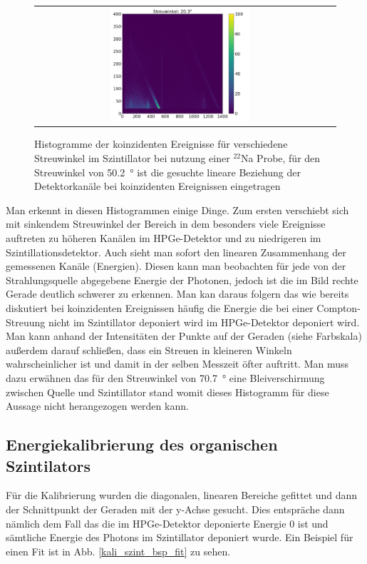 \begin{figure}[ht]
\begin{tabular}{c c}
        \includegraphics[width=0.49\textwidth]{images/kali_szint_Streuwinkel_20.png} & \\
    \end{tabular}
	\caption{Histogramme der koinzidenten Ereignisse für verschiedene Streuwinkel im Szintillator bei nutzung einer $^{22}$Na Probe, für den Streuwinkel von \SI{50.2}{\degree} ist die gesuchte lineare Beziehung der Detektorkanäle bei koinzidenten Ereignissen eingetragen}
	\label{kali_szint_winkelabh}
\end{figure}

Man erkennt in diesen Histogrammen einige Dinge. Zum ersten verschiebt sich mit sinkendem Streuwinkel der Bereich in dem besonders viele Ereignisse auftreten zu höheren Kanälen im HPGe-Detektor und zu niedrigeren im Szintillationsdetektor. Auch sieht man sofort den linearen Zusammenhang der gemessenen Kanäle (Energien). Diesen kann man beobachten für jede von der Strahlungsquelle abgegebene Energie der Photonen, jedoch ist die im Bild rechte Gerade deutlich schwerer zu erkennen. Man kan daraus folgern das wie bereits diskutiert bei koinzidenten Ereignissen häufig die Energie die bei einer Compton-Streuung nicht im Szintillator deponiert wird im HPGe-Detektor deponiert wird. Man kann anhand der Intensitäten der Punkte auf der Geraden (siehe Farbskala) außerdem darauf schließen, dass ein Streuen in kleineren Winkeln wahrscheinlicher ist und damit in der selben Messzeit öfter auftritt. Man muss dazu erwähnen das für den Streuwinkel von \SI{70.7}{\degree} eine Bleiverschirmung zwischen Quelle und Szintillator stand womit dieses Histogramm für diese Aussage nicht herangezogen werden kann.

\subsection{Energiekalibrierung des organischen Szintilators}

Für die Kalibrierung wurden die diagonalen, linearen Bereiche gefittet und dann der Schnittpunkt der Geraden mit der y-Achse gesucht. Dies entspräche dann nämlich dem Fall das die im HPGe-Detektor deponierte Energie $0$ ist und sämtliche Energie des Photons im Szintillator deponiert wurde. Ein Beispiel für einen Fit ist in Abb. \ref{kali_szint_bsp_fit} zu sehen.

